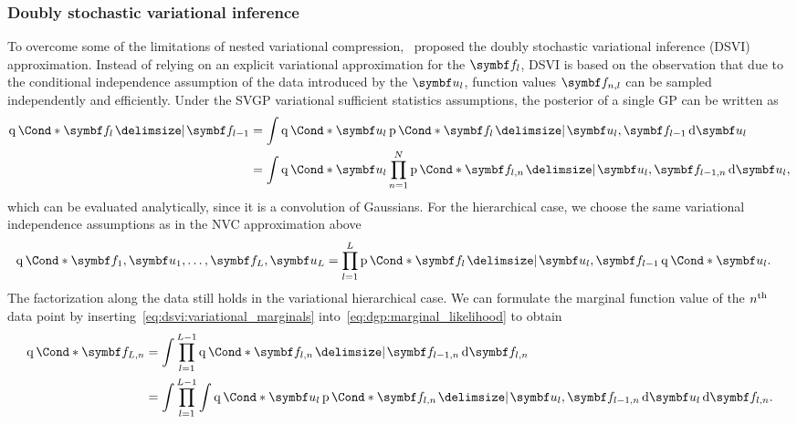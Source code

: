 \subsubsection{Doubly stochastic variational inference}
\label{toc:dsvi}
To overcome some of the limitations of nested variational compression,~\textcite{salimbeni_doubly_2017} proposed the doubly stochastic variational inference (DSVI) approximation.
Instead of relying on an explicit variational approximation for the $\mat{f}_l$, DSVI is based on the observation that due to the conditional independence assumption of the data introduced by the $\mat{u}_l$, function values $\mat{f}_{n,l}$ can be sampled independently and efficiently.
Under the SVGP variational sufficient statistics assumptions, the posterior of a single GP can be written as
\begin{equation}
    \begin{split}
        \label{eq:dsvi:variational_marginals}
        \Variat*{\mat{f}_l \given \mat{f}_{l-1}}
        &=
        \int \Variat*{\mat{u}_l}
        \Prob*{\mat{f}_l \given \mat{u}_l, \mat{f}_{l-1}}
        \diff \mat{u}_l
        \\
        &=
        \int \Variat*{\mat{u}_l}
        \prod_{n=1}^N \Prob*{\mat{f}_{l,n} \given \mat{u}_l, \mat{f}_{l-1, n}}
        \diff \mat{u}_l,
    \end{split}
\end{equation}
which can be evaluated analytically, since it is a convolution of Gaussians.
For the hierarchical case, we choose the same variational independence assumptions as in the NVC approximation above
\begin{equation}
    \begin{split}
        \label{eq:dsvi:variational_distribution}
        \Variat*{\mat{f}_1, \mat{u}_1, \dots, \mat{f}_L, \mat{u}_L}
        &= \prod_{l=1}^L \Prob*{\mat{f}_l \given \mat{u}_l, \mat{f}_{l-1}} \Variat*{\mat{u}_l}.
    \end{split}
\end{equation}
The factorization along the data still holds in the variational hierarchical case.
We can formulate the marginal function value of the $n^{\text{th}}$ data point by inserting~\cref{eq:dsvi:variational_marginals} into~\cref{eq:dgp:marginal_likelihood} to obtain
\begin{equation}
    \begin{split}
        \label{eq:dsvi:variational_layers}
        \Variat*{\mat{f}_{L,n}}
        &= \int \prod_{l=1}^{L-1} \Variat*{\mat{f}_{l,n} \given \mat{f}_{l-1,n}} \diff \mat{f}_{l, n} \\
        &= \int \prod_{l=1}^{L-1} \int \Variat*{\mat{u}_l} \Prob*{\mat{f}_{l,n} \given \mat{u}_l, \mat{f}_{l-1, n}} \diff \mat{u}_l \diff \mat{f}_{l, n}.
    \end{split}
\end{equation}

